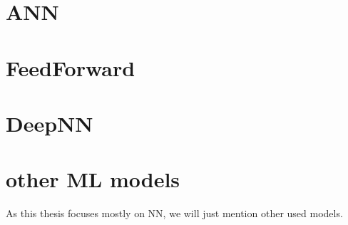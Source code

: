 \section{ANN}
\section{FeedForward}
\section{DeepNN}
\section{other ML models}

As this thesis focuses mostly on NN, we will just mention other used models.



